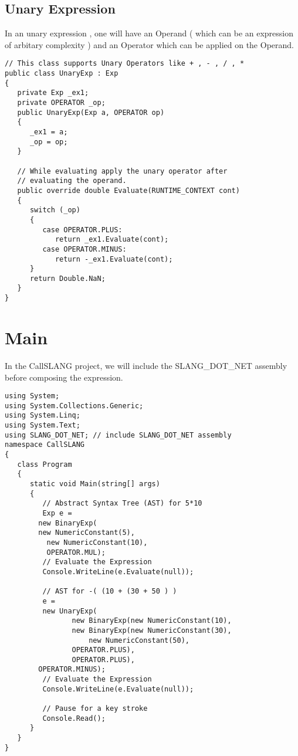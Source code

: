 \subsection{Unary Expression}
In an unary expression , one will have an Operand ( which can be an expression of arbitary complexity ) and an Operator which can be applied on the Operand.
\lstset{style=csharp}
\begin{lstlisting}
// This class supports Unary Operators like + , - , / , *
public class UnaryExp : Exp
{
   private Exp _ex1;
   private OPERATOR _op;
   public UnaryExp(Exp a, OPERATOR op)
   {
      _ex1 = a;
      _op = op;
   }

   // While evaluating apply the unary operator after 
   // evaluating the operand.
   public override double Evaluate(RUNTIME_CONTEXT cont)
   {
      switch (_op)
      {
         case OPERATOR.PLUS:
            return _ex1.Evaluate(cont);
         case OPERATOR.MINUS:
            return -_ex1.Evaluate(cont);
      }
      return Double.NaN;
   }
}
\end{lstlisting}
\clearpage 
\section{Main}
In the CallSLANG project, we will include the SLANG\_DOT\_NET assembly before composing the expression.
\\
\lstset{style=csharp}
\begin{lstlisting}
using System;
using System.Collections.Generic;
using System.Linq;
using System.Text;
using SLANG_DOT_NET; // include SLANG_DOT_NET assembly
namespace CallSLANG
{
   class Program
   {
      static void Main(string[] args)
      {
         // Abstract Syntax Tree (AST) for 5*10
         Exp e = 
		new BinaryExp(
		new NumericConstant(5),
          new NumericConstant(10),
          OPERATOR.MUL);
         // Evaluate the Expression
         Console.WriteLine(e.Evaluate(null));

         // AST for -( (10 + (30 + 50 ) )
         e = 
         new UnaryExp(
            	new BinaryExp(new NumericConstant(10),
	          	new BinaryExp(new NumericConstant(30),
            		new NumericConstant(50),
               	OPERATOR.PLUS),
            	OPERATOR.PLUS),
		OPERATOR.MINUS);
         // Evaluate the Expression
         Console.WriteLine(e.Evaluate(null));

         // Pause for a key stroke
         Console.Read();
      }
   } 
}
\end{lstlisting}
\clearpage 